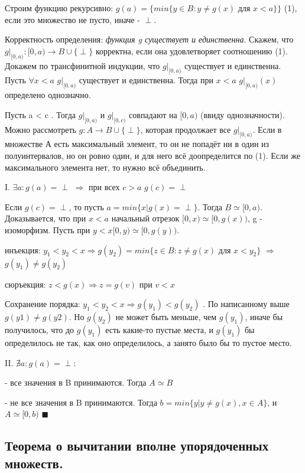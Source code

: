 Строим функцию рекурсивно:
$g(a) = \{min\{y \in B: y \neq g(x)$ для $x < a \}\}$ (1), если это множество не пусто, иначе - $\perp$.

Корректность определения: \emph{функция g  существует и единственна}.
Скажем, что $g|_{[0, a)}: [0,a) \rightarrow B\cup\{\perp\}$ корректна, если она удовлетворяет соотношению (1). Докажем по трансфинитной индукции, что $g|_{[0, a)}$ существует и единственна. Пусть $\forall x < a$ $g|_{[0, a)}$ существует и единственна. Тогда при $x < a$  $g|_{[0, a)}(x)$ определено однозначно. 

Пусть a < c . Тогда $g|_{[0, a)}$ и $g|_{[0, c)}$ совпадают на $[0, a)$ (ввиду однозначности). Можно рассмотреть $g: A  \rightarrow B \cup\{\perp\}$, которая продолжает все $g|_{[0, a)}$. Если в множестве А есть максимальный элемент, то он не попадёт ни в один из полуинтервалов, но он ровно один, и для него всё доопределится по (1). Если же максимального элемента нет, то нужно всё объединить.

I. $\exists a: g(a) = \perp$ $\Rightarrow$ при всех $c > a$ $g(c) = \perp$

Если $g(c) = \perp$, то пусть $a = min\{x| g(x) = \perp\}$. Тогда $B \simeq [0, a)$. Доказывается, что при $x < a$ начальный отрезок $[0, x) \simeq [0, g(x))$, g - изоморфизм. Пусть при  $y < x [0, y) \simeq [0, g(y))$.

	инъекция: $y_1 < y_2 < x \Rightarrow g(y_2) = min\{z \in B: z \neq g(x)$ для $x<y_2\}$ $\Rightarrow$ $g(y_1) \neq g(y_2)$
	
	
	сюръекция: $z < g(x) \Rightarrow z = g(v)$ при $v < x$
	

Сохранение порядка: $y_1 < y_2 < x \Rightarrow g(y_1) < g(y_2)$ . По написанному выше $g(y1) \neq g(y2)$. Но $g(y_2)$ не может быть меньше, чем $g(y_1)$, иначе бы получилось, что до $g(y_1)$ есть какие-то пустые места, и $g(y_1)$ бы определилось не так, как оно определилось, а занято было бы то пустое место.

II. $\nexists a: g(a) = \perp$: 

- все значения в B принимаются. Тогда $A \simeq B$

- не все значения в B принимаются. Тогда $b = min\{y | y \neq g(x), x \in A\}$, и $A \simeq [0, b)$
$\blacksquare$

\subsection{Теорема о вычитании вполне упорядоченных множеств.}

